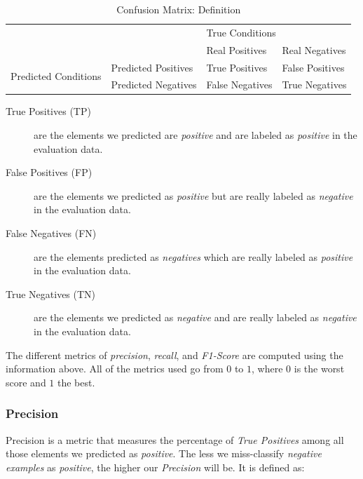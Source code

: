 \documentclass[epsfig,a4paper,11pt,titlepage,twoside,openany]{book}
\begin{document}
\begin{table}[H]
  \centering
  \begin{tabular}{ll|l|l|}
    \cline{3-4}
    &                     & \multicolumn{2}{l|}{True Conditions} \\ \cline{3-4} 
    &                     & Real Positives  & Real Negatives     \\ \hline
    \multicolumn{1}{|l|}{\multirow{2}{*}{Predicted Conditions}} & Predicted Positives & True Positives  & False Positives    \\ \cline{2-4} 
    \multicolumn{1}{|l|}{}                                      & Predicted Negatives & False Negatives & True Negatives     \\ \hline
  \end{tabular}
  \caption{Confusion Matrix: Definition}
  \label{tab:confusion-matrix-definition}
\end{table}

\begin{description}
\item[True Positives (TP)] are the elements we predicted are \textit{positive}
  and are labeled as \textit{positive} in the evaluation data.
 
\item[False Positives (FP)] are the elements we predicted as \textit{positive}
  but are really labeled as \textit{negative} in the evaluation data.
 
\item[False Negatives (FN)] are the elements predicted as \textit{negatives}
  which are really labeled as \textit{positive} in the evaluation data.
 
\item[True Negatives (TN)] are the elements we predicted as \textit{negative}
  and are really labeled as \textit{negative} in the evaluation data.
\end{description}


The different metrics of \textit{precision}, \textit{recall}, and
\textit{F1-Score} are computed using the information above. All of the metrics
used go from $0$ to $1$, where $0$ is the worst score and $1$ the best.


\subsubsection{Precision}
\label{sec:evaluation-metric-precision}

Precision is a metric that measures the percentage of \textit{True Positives}
among all those elements we predicted as \textit{positive}. The less we
miss-classify \textit{negative examples} as \textit{positive}, the higher our
\textit{Precision} will be. It is defined as:
\end{document}
